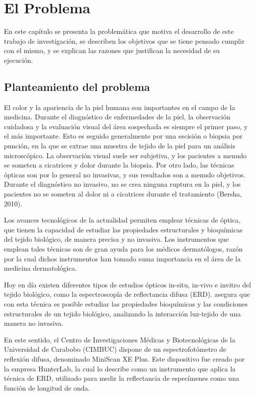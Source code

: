 \chapter{El Problema}

En este cap\'{i}tulo se presenta la problem\'{a}tica que motiva el desarrollo de este trabajo de investigaci\'{o}n, se describen los objetivos que se tiene pensado cumplir con el mismo, y se explican las razones que justifican la necesidad de su ejecuci\'{o}n.

	\section{Planteamiento del problema}	
El color y la apariencia de la piel humana son importantes en el campo de la medicina. Durante el diagn\'{o}stico de enfermedades de la piel, la observaci\'{o}n cuidadosa y la evaluaci\'{o}n visual del \'{a}rea sospechada es siempre el primer paso, y el m\'{a}s importante. Esto es seguido generalmente por una escisi\'{o}n o biopsia por punci\'{o}n, en la que se extrae una muestra de tejido de la piel para un an\'{a}lisis microsc\'{o}pico. La observaci\'{o}n visual suele ser subjetiva, y los pacientes a menudo se someten a cicatrices y dolor durante la biopsia. Por otro lado, las t\'{e}cnicas \'{o}pticas son por lo general no invasivas, y sus resultados son a menudo objetivos. Durante el diagn\'{o}stico no invasivo, no se crea ninguna ruptura en la piel, y los pacientes no se someten al dolor ni a cicatrices durante el tratamiento (Bersha, 2010).

Los avances tecnol\'{o}gicos de la actualidad permiten emplear t\'{e}cnicas de \'{o}ptica, que tienen la capacidad de estudiar  las propiedades estructurales y bioqu\'{i}micas del tejido biol\'{o}gico, de manera precisa y no invasiva. Los instrumentos que emplean tales t\'{e}cnicas son de gran ayuda para los m\'{e}dicos dermat\'{o}logos, raz\'{o}n por la cual dichos instrumentos han tomado suma importancia en el \'{a}rea de la medicina dermatol\'{o}gica.

Hoy en d\'{i}a existen diferentes tipos de estudios \'{o}pticos in-situ, in-vivo e invitro del tejido biol\'{o}gico, como la espectroscop\'{i}a de reflectancia difusa (ERD). \cite{Perez} asegura que con esta t\'{e}cnica es  posible estudiar las propiedades bioqu\'{i}micas y las condiciones estructurales de un tejido biol\'{o}gico, analizando la interacci\'{o}n luz-tejido de una manera no invasiva.

En este sentido, el Centro de Investigaciones M\'{e}dicas y Biotecnol\'{o}gicas de la Universidad de Carabobo (CIMBUC) dispone de un espectrofot\'{o}metro de reflexi\'{o}n difusa, denominado MiniScan XE Plus. Este dispositivo fue creado por la empresa HunterLab, la cual lo describe como un instrumento que aplica la t\'{e}cnica de ERD, utilizado para medir la reflectancia de espec\'{i}menes como una funci\'{o}n de longitud de onda.

